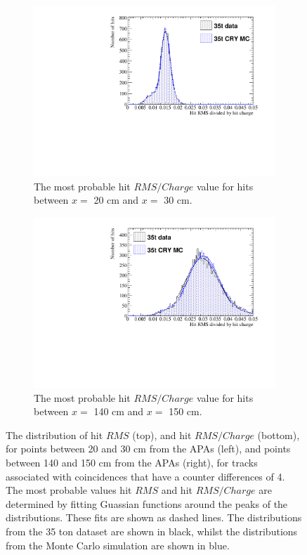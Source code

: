 \begin{figure}[h!]
\begin{subfigure}{0.48\textwidth}
    \includegraphics[width=\textwidth]{CombCan_2}
    \caption{The most probable hit $RMS/Charge$ value for hits between $x =$ 20 cm and $x =$ 30 cm.}
  \end{subfigure}%
  \hspace{0.03\textwidth}%
  \begin{subfigure}{0.48\textwidth}
    \centering
    \includegraphics[width=\textwidth]{CombCan_3}
    \caption{The most probable hit $RMS/Charge$ value for hits between $x =$ 140 cm and $x =$ 150 cm.}
  \end{subfigure}
  \caption[The most probable values of the $RMS$ and $RMS/Charge$ distributions for tracks with a counter difference of 4 in the 35 ton data and a low noise 35 ton detector]
          {The distribution of hit $RMS$ (top), and hit $RMS/Charge$ (bottom), for points between 20 and 30 cm from the APAs (left), and points between 140 and 150 cm from the APAs (right), for tracks associated with coincidences that have a counter differences of 4. The most probable values hit $RMS$ and hit $RMS/Charge$ are determined by fitting Guassian functions around the peaks of the distributions. These fits are shown as dashed lines. The distributions from the 35 ton dataset are shown in black, whilst the distributions from the Monte Carlo simulation are shown in blue.}
          \label{fig:DiffMCHitFit}
\end{figure}

